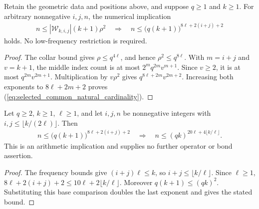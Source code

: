 \begin{lemma}
    \label{thm:selected_common_natural_cardinality}
    \leanok
    Retain the geometric data and positions above, and suppose $q\ge1$ and
    $k\ge1$. For arbitrary nonnegative $i,j,n$, the numerical implication
    \begin{align}
        n\le |\mathcal W_{k,i,j}|(k+1)\rho^2
        \quad\Longrightarrow\quad
        n\le\bigl(q(k+1)\bigr)^{8\ell+2(i+j)+2}
        \label{eq:selected_common_natural_cardinality}
    \end{align}
    holds. No low-frequency restriction is required.
\end{lemma}
\begin{proof}\leanok
    The collar bound gives $\rho\le q^{4\ell}$, and hence
    $\rho^2\le q^{8\ell}$. With $m=i+j$ and $v=k+1$, the middle index count is
    at most $2^m q^{2m}v^{m+1}$. Since $v\ge2$, it is at most
    $q^{2m}v^{2m+1}$. Multiplication by $v\rho^2$ gives
    $q^{8\ell+2m}v^{2m+2}$.
    Increasing both exponents to $8\ell+2m+2$ proves
    (\ref{eq:selected_common_natural_cardinality}).
\end{proof}

\begin{lemma}
    \label{thm:selected_common_natural_low_frequency_cardinality}
    \leanok
    Let $q\ge2$, $k\ge1$, $\ell\ge1$, and let $i,j,n$ be nonnegative integers
    with $i,j\le\lfloor k/(2\ell)\rfloor$. Then
    \begin{align}
        n\le\bigl(q(k+1)\bigr)^{8\ell+2(i+j)+2}
        \quad\Longrightarrow\quad
        n\le(qk)^{20\ell+4\lfloor k/\ell\rfloor}.
        \label{eq:selected_common_natural_low_frequency_cardinality}
    \end{align}
    This is an arithmetic implication and supplies no further operator or
    bond assertion.
\end{lemma}
\begin{proof}\leanok
    The frequency bounds give $(i+j)\ell\le k$, so
    $i+j\le\lfloor k/\ell\rfloor$. Since $\ell\ge1$,
    $8\ell+2(i+j)+2\le10\ell+2\lfloor k/\ell\rfloor$.
    Moreover $q(k+1)\le(qk)^2$. Substituting this base comparison doubles the
    last exponent and gives the stated bound.
\end{proof}
